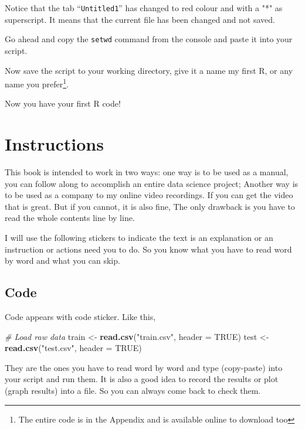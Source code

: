 \documentclass[
]{book}
\newenvironment{Shaded}{\begin{snugshade}}{\end{snugshade}}
\newcommand{\CommentTok}[1]{\textcolor[rgb]{0.56,0.35,0.01}{\textit{#1}}}
\newcommand{\DataTypeTok}[1]{\textcolor[rgb]{0.13,0.29,0.53}{#1}}
\newcommand{\KeywordTok}[1]{\textcolor[rgb]{0.13,0.29,0.53}{\textbf{#1}}}
\newcommand{\NormalTok}[1]{#1}
\newcommand{\OtherTok}[1]{\textcolor[rgb]{0.56,0.35,0.01}{#1}}
\newcommand{\StringTok}[1]{\textcolor[rgb]{0.31,0.60,0.02}{#1}}
\begin{document}
Notice that the tab ``\texttt{Untitled1}'' has changed to red colour and with a "*" as superscript. It means that the current file has been changed and not saved.

Go ahead and copy the \texttt{setwd} command from the console and paste it into your script.

Now save the script to your working directory, give it a name my first R, or any name you prefer\footnote{The entire code is in the Appendix and is available online to download too}.

Now you have your first R code!

\hypertarget{instructions}{%
\section{Instructions}\label{instructions}}

This book is intended to work in two ways: one way is to be used as a manual, you can follow along to accomplish an entire data science project; Another way is to be used as a company to my online video recordings. If you can get the video that is great. But if you cannot, it is also fine, The only drawback is you have to read the whole contents line by line.

I will use the following stickers to indicate the text is an explanation or an instruction or actions need you to do. So you know what you have to read word by word and what you can skip.

\hypertarget{code}{%
\subsection*{Code}\label{code}}


Code appears with code sticker. Like this,

\begin{Shaded}
\begin{Highlighting}[]
\CommentTok{# Load raw data}
\NormalTok{train <-}\StringTok{ }\KeywordTok{read.csv}\NormalTok{(}\StringTok{"train.csv"}\NormalTok{, }\DataTypeTok{header =} \OtherTok{TRUE}\NormalTok{)}
\NormalTok{test <-}\StringTok{ }\KeywordTok{read.csv}\NormalTok{(}\StringTok{"test.csv"}\NormalTok{, }\DataTypeTok{header =} \OtherTok{TRUE}\NormalTok{)}
\end{Highlighting}
\end{Shaded}

They are the ones you have to read word by word and type (copy-paste) into your script and run them. It is also a good idea to record the results or plot (graph results) into a file. So you can always come back to check them.
\end{document}
